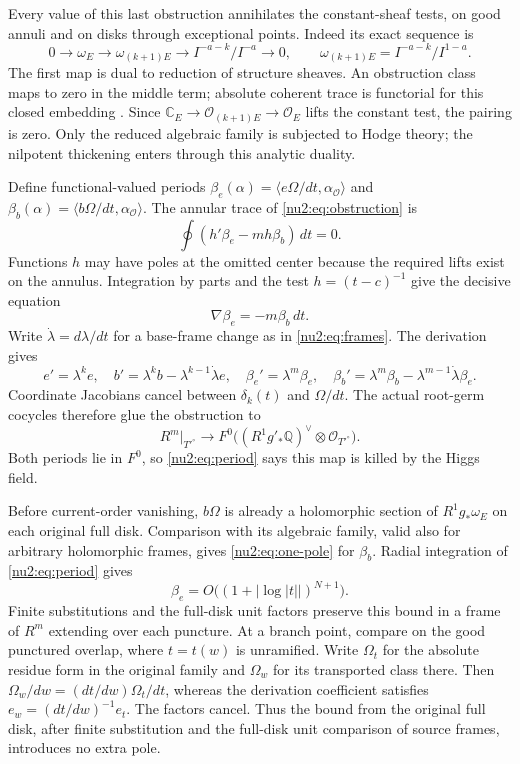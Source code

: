 Every value of this last obstruction annihilates the constant-sheaf
tests, on good annuli and on disks through exceptional points.
Indeed its exact sequence is
\[
 0\to\omega_E\to\omega_{(k+1)E}
 \to I^{-a-k}/I^{-a}\to0,
 \qquad\omega_{(k+1)E}=I^{-a-k}/I^{1-a}.
\]
The first map is dual to reduction of structure sheaves.  An
obstruction class maps to zero in the middle term; absolute coherent
trace is functorial for this closed embedding
\cite[\S\S3--5]{RamisRuget1970}.  Since
$\mathbb C_E\to\mathcal O_{(k+1)E}\to\mathcal O_E$ lifts the
constant test, the pairing is zero.  Only the reduced algebraic
family is subjected to Hodge theory; the nilpotent thickening enters
through this analytic duality.

Define functional-valued periods
$\beta_e(\alpha)=\langle e\Omega/dt,\alpha_{\mathcal O}\rangle$
and $\beta_b(\alpha)=\langle b\Omega/dt,\alpha_{\mathcal O}\rangle$.
The annular trace of \eqref{nu2:eq:obstruction} is
\[
 \oint(h'\beta_e-mh\beta_b)\,dt=0.
\]
Functions $h$ may have poles at the omitted center because the
required lifts exist on the annulus.  Integration by parts and the
test $h=(t-c)^{-1}$ give the decisive equation
\begin{equation}\label{nu2:eq:period}
 \nabla\beta_e=-m\beta_b\,dt.
\end{equation}
Write $\dot\lambda=d\lambda/dt$ for a base-frame change as in
\eqref{nu2:eq:frames}.  The derivation gives
\[
 e'=\lambda^ke,\quad b'=\lambda^kb-\lambda^{k-1}\dot\lambda e,
 \quad\beta_e'=\lambda^m\beta_e,\quad
 \beta_b'=\lambda^m\beta_b-\lambda^{m-1}\dot\lambda\beta_e.
\]
Coordinate Jacobians cancel between $\delta_k(t)$ and $\Omega/dt$.
The actual root-germ cocycles therefore glue the obstruction to
\begin{equation}\label{nu2:eq:positive-map}
 R^m|_{T'^\circ}\longrightarrow
 F^0\bigl((R^1g'_*\mathbb Q)^\vee\otimes\mathcal O_{T'^\circ}\bigr).
\end{equation}
Both periods lie in $F^0$, so \eqref{nu2:eq:period} says this map
is killed by the Higgs field.

Before current-order vanishing, $b\Omega$ is already a holomorphic
section of $R^1g_*\omega_E$ on each original full disk.  Comparison
with its algebraic family, valid also for arbitrary holomorphic
frames, gives \eqref{nu2:eq:one-pole} for $\beta_b$.
Radial integration of \eqref{nu2:eq:period} gives
\[
 \beta_e=O\bigl((1+|\log|t||)^{N+1}\bigr).
\]
Finite substitutions and the full-disk unit factors preserve this
bound in a frame of $R^m$ extending over each puncture.  At a branch
point, compare on the good punctured overlap, where $t=t(w)$ is
unramified.  Write $\Omega_t$ for the absolute residue form in
the original family and $\Omega_w$ for its transported class
there.  Then $\Omega_w/dw=(dt/dw)\Omega_t/dt$, whereas the
derivation coefficient satisfies $e_w=(dt/dw)^{-1}e_t$.
The factors cancel.  Thus the bound from the original full disk,
after finite substitution and the full-disk unit comparison of
source frames, introduces no extra pole.

